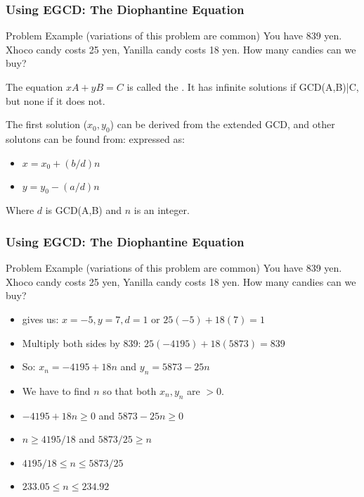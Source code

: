 \documentclass{beamer}
\begin{document}
\begin{frame}
  \frametitle{Using EGCD: The Diophantine Equation}
  {\smaller
    \begin{block}{Problem Example (variations of this problem are common)}
      You have 839 yen. \alert{X}hoco candy costs 25 yen,
      \alert{Y}anilla candy costs 18 yen. How many candies can we buy?
    \end{block}

    \bigskip

    The equation $xA+yB=C$ is called the . It has infinite solutions if GCD(A,B)|C, but none if
    it does not.

    \bigskip

    The first solution ($x_0,y_0$) can be derived from the extended
    GCD, and other solutons can be found from:
    expressed as:
    \begin{itemize}
    \item $x = x_0 + (b/d)n$
    \item $y = y_0 - (a/d)n$
    \end{itemize}
    Where $d$ is GCD(A,B) and $n$ is an integer.
  }
\end{frame}

\begin{frame}
  \frametitle{Using EGCD: The Diophantine Equation}
  {\smaller
    \begin{block}{Problem Example (variations of this problem are common)}
      You have 839 yen. \alert{X}hoco candy costs 25 yen,
      \alert{Y}anilla candy costs 18 yen. How many candies can we buy?
    \end{block}

    \begin{itemize}
    \item {} gives us: $x=-5, y=7, d=1$ or $25(-5)+18(7) = 1$
    \item Multiply both sides by 839: $25(-4195)+18(5873) = 839$
    \item So: $x_n = -4195 + 18n$ and $y_n = 5873 - 25n$
    \item We have to find $n$ so that both $x_n,y_n$ are $> 0$.
    \item $-4195 + 18n \geq 0$ and $5873 - 25n \geq 0$
    \item $n \geq 4195/18$ and $5873/25 \geq n$
    \item $4195/18 \leq n \leq 5873/25$
    \item $233.05 \leq n \leq 234.92$
    \end{itemize}
  }
\end{frame}
\end{document}
